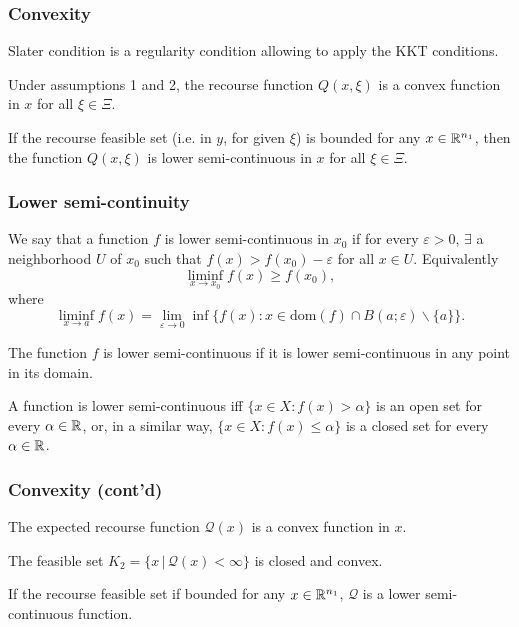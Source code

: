 \documentclass[french]{beamer}
\begin{document}
\begin{frame}
\frametitle{Convexity}

Slater condition is a {\blue regularity} condition allowing to apply the KKT conditions.

\mbox{}

\begin{theorem}
Under assumptions 1 and 2, the recourse function $Q(x,\xi)$ is a convex function in $x$ for all $\xi \in \Xi$.
\end{theorem}

\begin{theorem}
If the recourse feasible set (i.e. in $y$, for given $\xi$) is bounded for any $x \in \mathbb{R}^{n_1}$, then the function $Q(x,\xi)$ is lower semi-continuous in $x$ for all $\xi \in \Xi$.
\end{theorem}

\end{frame}

\begin{frame}
\frametitle{Lower semi-continuity}

We say that a function $f$ is {\blue lower semi-continuous in $x_0$} if for every $\varepsilon > 0$, $\exists$ a neighborhood $U$ of $x_0$ such that $f(x) > f(x_0) - \varepsilon$ for all $x \in U$.
Equivalently
\[
    \liminf_{x \to x_{0}} f(x) \geq f(x_{0}),
\]
where
\[
    \liminf_{x \to a} f(x) = \lim_{\varepsilon \to 0} \inf \{ f(x) : x
    \in \mbox{dom}(f) \cap B(a;\varepsilon) \backslash \{a\} \}.
\]

\mbox{}

The function $f$ is {\blue lower semi-continuous} if it is lower semi-continuous in any point in its domain.

\mbox{}

A function is lower semi-continuous iff $\lbrace x\in X : f(x) > \alpha \rbrace$ is an open set for every  $\alpha \in \mathbb{R}$, or, in a similar way, $\lbrace x\in X : f(x) \leq \alpha \rbrace$ is a closed set for every $\alpha \in \mathbb{R}$.

\end{frame}

\begin{frame}
\frametitle{Convexity (cont'd)}

\begin{corollary}
The expected recourse function $\mathcal{Q}(x)$ is a convex function in $x$.
\end{corollary}

\begin{corollary}
The feasible set $K_2 = \lbrace x \,|\, \mathcal{Q}(x) < \infty \rbrace$ is closed and convex.
\end{corollary}

\begin{corollary}
If the recourse feasible set if bounded for any $x \in \mathbb{R}^{n_1}$, $\mathcal{Q}$ is a lower semi-continuous function.
\end{corollary}

\end{frame}
\end{document}
